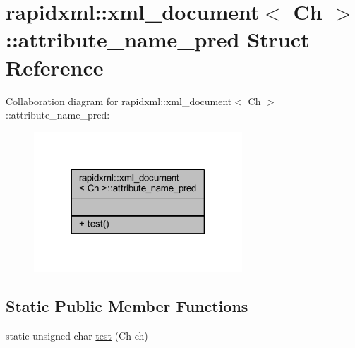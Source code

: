 \hypertarget{structrapidxml_1_1xml__document_1_1attribute__name__pred}{\section{rapidxml\+:\+:xml\+\_\+document$<$ Ch $>$\+:\+:attribute\+\_\+name\+\_\+pred Struct Reference}
\label{structrapidxml_1_1xml__document_1_1attribute__name__pred}
}


Collaboration diagram for rapidxml\+:\+:xml\+\_\+document$<$ Ch $>$\+:\+:attribute\+\_\+name\+\_\+pred\+:
\nopagebreak
\begin{figure}[H]
\begin{center}
\leavevmode
\includegraphics[width=221pt]{structrapidxml_1_1xml__document_1_1attribute__name__pred__coll__graph}
\end{center}
\end{figure}
\subsection*{Static Public Member Functions}
\begin{DoxyCompactItemize}
\item 
static unsigned char \hyperlink{structrapidxml_1_1xml__document_1_1attribute__name__pred_a2cf003483847dfabcf0c83877818a4c5}{test} (Ch ch)
\end{DoxyCompactItemize}


